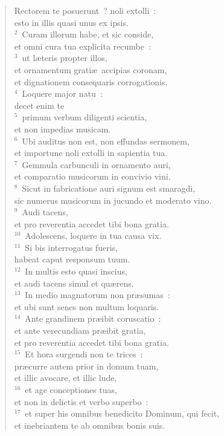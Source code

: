 \begin{flushleft}\begin{verse}\vspace{-19pt}\hspace{6pt}Rectorem te posuerunt~? noli extolli~:\\\hspace{6pt} esto in illis quasi unus ex ipsis.\\
${}^{2}$~Curam illorum habe, et sic conside,\\ et omni cura tua explicita recumbe~:\\
${}^{3}$~ut l\ae teris propter illos,\\ et ornamentum grati\ae\ accipias coronam,\\ et dignationem consequaris corrogationis.\\
${}^{4}$~Loquere major natu~:\\ decet enim te\\
${}^{5}$~primum verbum diligenti scientia,\\ et non impedias musicam.\\
${}^{6}$~Ubi auditus non est, non effundas sermonem,\\ et importune noli extolli in sapientia tua.\\
${}^{7}$~Gemmula carbunculi in ornamento auri,\\ et comparatio musicorum in convivio vini.\\
${}^{8}$~Sicut in fabricatione auri signum est smaragdi,\\ sic numerus musicorum in jucundo et moderato vino.\\
${}^{9}$~Audi tacens,\\ et pro reverentia accedet tibi bona gratia.\\
${}^{10}$~Adolescens, loquere in tua causa vix.\\
${}^{11}$~Si bis interrogatus fueris,\\ habeat caput responsum tuum.\\
${}^{12}$~In multis esto quasi inscius,\\ et audi tacens simul et qu\ae rens.\\
${}^{13}$~In medio magnatorum non pr\ae sumas~:\\ et ubi sunt senes non multum loquaris.\\
${}^{14}$~Ante grandinem pr\ae ibit coruscatio~:\\ et ante verecundiam pr\ae ibit gratia,\\ et pro reverentia accedet tibi bona gratia.\\
${}^{15}$~Et hora surgendi non te trices~:\\ pr\ae curre autem prior in domum tuam,\\ et illic avocare, et illic lude,\\
${}^{16}$~et age conceptiones tuas,\\ et non in delictis et verbo superbo~:\\
${}^{17}$~et super his omnibus benedicito Dominum, qui fecit,\\ et inebriantem te ab omnibus bonis suis.\end{verse}\end{flushleft}


